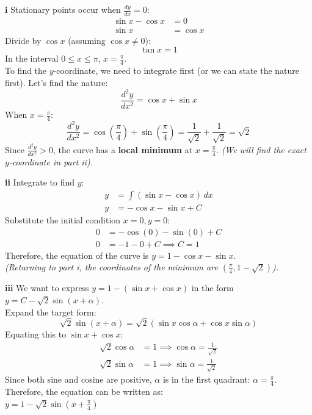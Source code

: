 \begin{solution}
\textbf{i} Stationary points occur when $\frac{dy}{dx} = 0$:
\begin{align*}
    \sin x - \cos x &= 0 \\
    \sin x &= \cos x
\end{align*}
Divide by $\cos x$ (assuming $\cos x \neq 0$):
\[ \tan x = 1 \]
In the interval $0 \le x \le \pi$, $x = \frac{\pi}{4}$. \\
To find the $y$-coordinate, we need to integrate first (or we can state the nature first). Let's find the nature:
\[ \frac{d^2y}{dx^2} = \cos x + \sin x \]
When $x = \frac{\pi}{4}$:
\[ \frac{d^2y}{dx^2} = \cos\left(\frac{\pi}{4}\right) + \sin\left(\frac{\pi}{4}\right) = \frac{1}{\sqrt{2}} + \frac{1}{\sqrt{2}} = \sqrt{2} \]
Since $\frac{d^2y}{dx^2} > 0$, the curve has a \textbf{local minimum} at $x = \frac{\pi}{4}$. 
\textit{(We will find the exact $y$-coordinate in part ii).}

\vspace{0.3cm}
\textbf{ii} Integrate to find $y$:
\begin{align*}
    y &= \int (\sin x - \cos x) \, dx \\
    y &= -\cos x - \sin x + C
\end{align*}
Substitute the initial condition $x=0, y=0$:
\begin{align*}
    0 &= -\cos(0) - \sin(0) + C \\
    0 &= -1 - 0 + C \implies C = 1
\end{align*}
Therefore, the equation of the curve is \textbf{$y = 1 - \cos x - \sin x$}. \\
\textit{(Returning to part i, the coordinates of the minimum are $(\frac{\pi}{4}, 1 - \sqrt{2})$).}

\vspace{0.3cm}
\textbf{iii} We want to express $y = 1 - (\sin x + \cos x)$ in the form $y = C - \sqrt{2}\sin(x + \alpha)$. \\
Expand the target form:
\[ \sqrt{2}\sin(x + \alpha) = \sqrt{2}(\sin x \cos \alpha + \cos x \sin \alpha) \]
Equating this to $\sin x + \cos x$:
\begin{align*}
    \sqrt{2}\cos \alpha &= 1 \implies \cos \alpha = \frac{1}{\sqrt{2}} \\
    \sqrt{2}\sin \alpha &= 1 \implies \sin \alpha = \frac{1}{\sqrt{2}}
\end{align*}
Since both sine and cosine are positive, $\alpha$ is in the first quadrant: $\alpha = \frac{\pi}{4}$. \\
Therefore, the equation can be written as: \\
\textbf{$y = 1 - \sqrt{2}\sin\left(x + \frac{\pi}{4}\right)$}


\end{solution}
